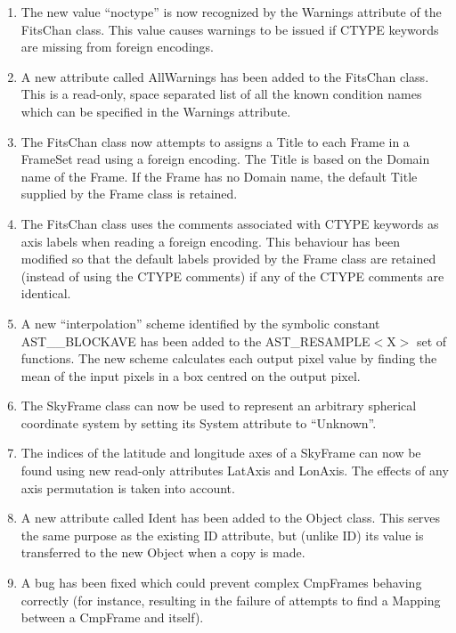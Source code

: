 \documentclass[twoside,11pt]{starlink}
\begin{document}
\begin{enumerate}
\item The new value ``noctype'' is now recognized by the Warnings attribute
of the FitsChan class. This value causes warnings to be issued if CTYPE
keywords are missing from foreign encodings.

\item A new attribute called AllWarnings has been added to the FitsChan
class. This is a read-only, space separated list of all the known condition
names which can be specified in the Warnings attribute.

\item The FitsChan class now attempts to assigns a Title to each Frame in
a FrameSet read using a foreign encoding. The Title is based on the Domain
name of the Frame. If the Frame has no Domain name, the default Title
supplied by the Frame class is retained.

\item The FitsChan class uses the comments associated with CTYPE
keywords as axis labels when reading a foreign encoding. This behaviour
has been modified so that the default labels provided by the Frame class
are retained (instead of using the CTYPE comments) if any of the CTYPE
comments are identical.

\item A new ``interpolation'' scheme identified by the symbolic constant
AST\_\_BLOCKAVE has been added to the AST\_RESAMPLE$<$X$>$ set of
functions. The new scheme calculates each output pixel value by finding
the mean of the input pixels in a box centred on the output pixel.

\item The SkyFrame class can now be used to represent an arbitrary spherical
coordinate system by setting its System attribute to ``Unknown''.

\item The indices of the latitude and longitude axes of a SkyFrame can
now be found using new read-only attributes LatAxis and LonAxis. The
effects of any axis permutation is taken into account.

\item A new attribute called Ident has been added to the Object class.
This serves the same purpose as the existing ID attribute, but (unlike ID)
its value is transferred to the new Object when a copy is made.

\item A bug has been fixed which could prevent complex CmpFrames
behaving correctly (for instance, resulting in the failure of attempts
to find a Mapping between a CmpFrame and itself).

\end{enumerate}
\end{document}
